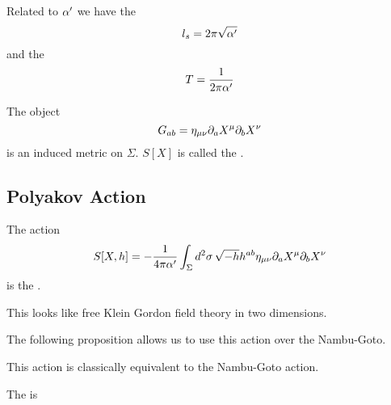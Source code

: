 \documentclass{article}
\begin{document}
\begin{definition}
	Related to $\alpha^\prime$ we have the 
	\[
	l_s = 2 \pi \sqrt{\alpha^\prime}
	\]
	and
	the  
	\[
	T = \frac{1}{2\pi \alpha^\prime}
	\]
\end{definition}
\begin{definition}
The object 
\[
G_{ab} = \eta_{\mu\nu}\partial_a X^\mu \partial_b X^\nu
\]
is an induced metric on $\Sigma$. $S[X]$ is called the .
\end{definition}

\subsection{Polyakov Action}
\begin{definition}
The action 
\[
S[X,h] = -\frac{1}{4\pi \alpha^\prime} \int_\Sigma d^2\sigma \, \sqrt{-h} h^{ab} \eta_{\mu\nu} \partial_a X^\mu \partial_b X^\nu
\]
is the .
\end{definition}
\begin{idea}
This looks like free Klein Gordon field theory in two dimensions.
\end{idea}
The following proposition allows us to use this action over the Nambu-Goto.
\begin{prop}
This action is classically equivalent to the Nambu-Goto action.
\end{prop}

\begin{definition}
	The  is 
\end{definition}
\end{document}
